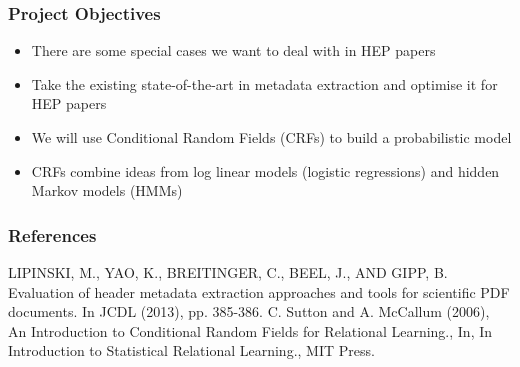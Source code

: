 \documentclass{beamer}
\begin{document}

\begin{frame}
\frametitle{Project Objectives}
\begin{itemize}
\item There are some special cases we want to deal with in HEP papers
\item Take the existing state-of-the-art in metadata extraction and optimise it for HEP papers
\item We will use Conditional Random Fields (CRFs) to build a probabilistic model
\item CRFs combine ideas from log linear models (logistic regressions) and hidden Markov models (HMMs)
\end{itemize}
\end{frame}


\begin{frame}
\frametitle{References}

\begin{thebibliography}{0}

 LIPINSKI, M., YAO, K., BREITINGER, C., BEEL, J., AND GIPP, B. Evaluation of header metadata extraction approaches and tools for scientific PDF documents. In JCDL (2013), pp. 385-386.
 C. Sutton and A. McCallum (2006), An Introduction to Conditional Random Fields for Relational Learning., In, In Introduction to Statistical Relational Learning., MIT Press.

\end{thebibliography}

\end{frame}
\end{document}
